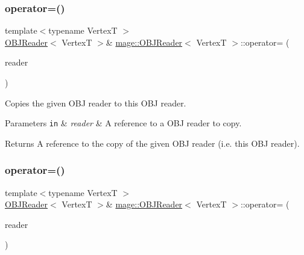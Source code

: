 \subsubsection{\texorpdfstring{operator=()}{operator=()}\hspace{0.1cm}{\footnotesize\ttfamily [1/2]}}
{\footnotesize\ttfamily template$<$typename VertexT $>$ \\
\hyperlink{classmage_1_1_o_b_j_reader}{O\+B\+J\+Reader}$<$ VertexT $>$\& \hyperlink{classmage_1_1_o_b_j_reader}{mage\+::\+O\+B\+J\+Reader}$<$ VertexT $>$\+::operator= (\begin{DoxyParamCaption}\item[{const \hyperlink{classmage_1_1_o_b_j_reader}{O\+B\+J\+Reader}$<$ VertexT $>$ \&}]{reader }\end{DoxyParamCaption})\hspace{0.3cm}{\ttfamily [delete]}}

Copies the given O\+BJ reader to this O\+BJ reader.


\begin{DoxyParams}[1]{Parameters}
\mbox{\tt in}  & {\em reader} & A reference to a O\+BJ reader to copy. \\
\hline
\end{DoxyParams}
\begin{DoxyReturn}{Returns}
A reference to the copy of the given O\+BJ reader (i.\+e. this O\+BJ reader). 
\end{DoxyReturn}
\hypertarget{classmage_1_1_o_b_j_reader_ab2dfc9fb0ee6c15ededf97e571bcb11d}{}\label{classmage_1_1_o_b_j_reader_ab2dfc9fb0ee6c15ededf97e571bcb11d} 
\subsubsection{\texorpdfstring{operator=()}{operator=()}\hspace{0.1cm}{\footnotesize\ttfamily [2/2]}}
{\footnotesize\ttfamily template$<$typename VertexT $>$ \\
\hyperlink{classmage_1_1_o_b_j_reader}{O\+B\+J\+Reader}$<$ VertexT $>$\& \hyperlink{classmage_1_1_o_b_j_reader}{mage\+::\+O\+B\+J\+Reader}$<$ VertexT $>$\+::operator= (\begin{DoxyParamCaption}\item[{\hyperlink{classmage_1_1_o_b_j_reader}{O\+B\+J\+Reader}$<$ VertexT $>$ \&\&}]{reader }\end{DoxyParamCaption})\hspace{0.3cm}{\ttfamily [delete]}}

